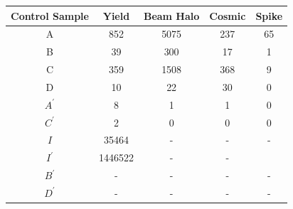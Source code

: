 \begin{minipage}{\linewidth} 
\begin{center}
\begin{tabular}{c| c| c| c| c }
\toprule
 \hline
\bfseries{Control Sample} & Yield & Beam Halo & Cosmic & Spike \\
\hline
\toprule
\textsf{A} & 852 & 5075 & 237 & 65\\
\textsf{B} & 39 & 300&  17 &  1\\
\textsc{C} & 359 & 1508 & 368 & 9  \\
\textsf{D} & 10 & 22 & 30 & 0 \\
\hline\hline
\textsf{$A^{\prime}$}& 8 &  1& 1 & 0\\ 
\textsf{$C^{\prime}$}& 2 & 0 & 0 & 0\\  
\textsf{$I$} & 35464 & -& - & -\\    
\textsf{$I^{\prime}$}&  1446522 & - & - & \\       
\textsf{$B^{\prime}$}& - &-  & - & -\\    
\textsf{$D^{\prime}$}& - & - & - & -\\      
\hline
\bottomrule
\end{tabular}
\label{tab:EVTYIELD} 
\end{center}
\end{minipage}

